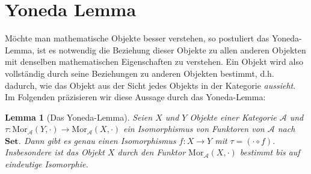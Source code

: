 \documentclass[leqno]{article}
\theoremstyle{plain}
\newtheorem{lem}[thm]{Lemma}
\theoremstyle{definition}
\theoremstyle{remark}
\begin{document}
\section{Yoneda Lemma}
Möchte man mathematische Objekte besser verstehen, so postuliert das Yoneda-Lemma, ist es notwendig die Beziehung dieser Objekte zu allen anderen Objekten mit denselben mathematischen Eigenschaften zu verstehen. Ein Objekt wird also vollständig durch seine Beziehungen zu anderen Objekten bestimmt, d.h. dadurch, wie das Objekt aus der Sicht jedes Objekts in der Kategorie \emph{aussieht}. Im Folgenden präzisieren wir diese Aussage durch das Yoneda-Lemma:

\begin{lem}[Das Yoneda-Lemma]
Seien $X$ und $Y$ Objekte einer Kategorie $\mathcal{A}$ und $\tau: \text{Mor}_{\mathcal{A}}(Y,\cdot) \rightarrow \text{Mor}_{\mathcal{A}}(X,\cdot)$ ein Isomorphismus von Funktoren von $\mathcal{A}$ nach $\textbf{Set}$. Dann gibt es genau einen Isomorphismus $f: X \rightarrow Y$ mit $\tau = (\cdot \circ f)$. Insbesondere ist das Objekt $X$ durch den Funktor $\text{Mor}_{\mathcal{A}}(X,\cdot)$ bestimmt bis auf eindeutige Isomorphie.
\end{lem}
\end{document}
